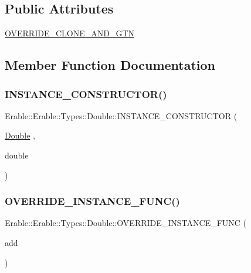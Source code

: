 \subsection*{Public Attributes}
\begin{DoxyCompactItemize}
\item 
\mbox{\hyperlink{class_erable_1_1_erable_1_1_types_1_1_double_ada5e03934cf7643e1e3fdbd592ffecc3}{O\+V\+E\+R\+R\+I\+D\+E\+\_\+\+C\+L\+O\+N\+E\+\_\+\+A\+N\+D\+\_\+\+G\+TN}}
\end{DoxyCompactItemize}


\subsection{Member Function Documentation}
\mbox{\label{class_erable_1_1_erable_1_1_types_1_1_double_a741d7bd9011b4041431e87f10ed25c7c}} 
\subsubsection{\texorpdfstring{INSTANCE\_CONSTRUCTOR()}{INSTANCE\_CONSTRUCTOR()}}
{\footnotesize\ttfamily Erable\+::\+Erable\+::\+Types\+::\+Double\+::\+I\+N\+S\+T\+A\+N\+C\+E\+\_\+\+C\+O\+N\+S\+T\+R\+U\+C\+T\+OR (\begin{DoxyParamCaption}\item[{\mbox{\hyperlink{class_erable_1_1_erable_1_1_types_1_1_double}{Double}}}]{,  }\item[{double}]{ }\end{DoxyParamCaption})}

\mbox{\label{class_erable_1_1_erable_1_1_types_1_1_double_a6a7f810740a1bc943e03ae230d9474c7}} 
\subsubsection{\texorpdfstring{OVERRIDE\_INSTANCE\_FUNC()}{OVERRIDE\_INSTANCE\_FUNC()}\hspace{0.1cm}{\footnotesize\ttfamily [1/8]}}
{\footnotesize\ttfamily Erable\+::\+Erable\+::\+Types\+::\+Double\+::\+O\+V\+E\+R\+R\+I\+D\+E\+\_\+\+I\+N\+S\+T\+A\+N\+C\+E\+\_\+\+F\+U\+NC (\begin{DoxyParamCaption}\item[{add}]{ }\end{DoxyParamCaption})}

